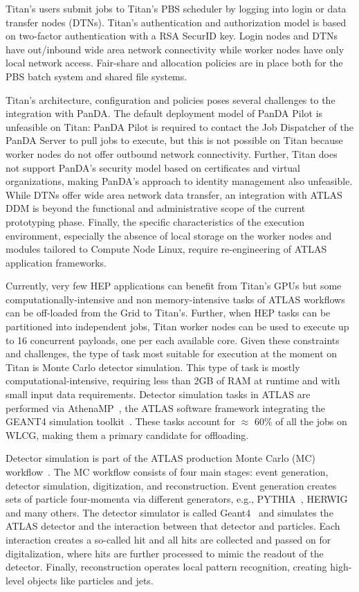 Titan's users submit jobs to Titan's PBS scheduler by logging into login or data
transfer nodes (DTNs). Titan's authentication and authorization model is based
on two-factor authentication with a RSA SecurID key. Login nodes and DTNs have
out/inbound wide area network connectivity while worker nodes have only local
network access. Fair-share and allocation policies are in place both for the PBS
batch system and shared file systems.

Titan's architecture, configuration and policies poses several challenges to the
integration with PanDA. The default deployment
model of PanDA Pilot is unfeasible on Titan: PanDA Pilot is required to contact
the Job Dispatcher of the PanDA Server to pull jobs to execute, but this is not
possible on Titan because worker nodes do not offer outbound network
connectivity. Further, Titan does not support PanDA's security model based on
certificates and virtual organizations, making PanDA's approach to identity
management also unfeasible. While DTNs offer wide area network data transfer, an
integration with ATLAS DDM is beyond the functional and administrative scope of
the current prototyping phase. Finally, the specific characteristics of the
execution environment, especially the absence of local storage on the worker
nodes and modules tailored to Compute Node Linux, require re-engineering of
ATLAS application frameworks.

Currently, very few HEP applications can benefit from Titan's GPUs but some
computationally-intensive and non memory-intensive tasks of ATLAS workflows can
be off-loaded from the Grid to Titan's. Further, when HEP tasks can be
partitioned into independent jobs, Titan worker nodes can be used to execute up
to 16 concurrent payloads, one per each available core. Given these constraints
and challenges, the type of task most suitable for execution at the moment on
Titan is Monte Carlo detector simulation. This type of task is mostly
computational-intensive, requiring less than 2GB of RAM at runtime and with
small input data requirements. Detector simulation tasks in ATLAS are performed
via AthenaMP~\cite{aad2010atlas}, the ATLAS software framework integrating the
GEANT4 simulation toolkit~\cite{agostinelli2003geant4}. These tasks account for
$\approx$ 60\% of all the jobs on WLCG, making them a primary candidate for
offloading.

Detector simulation is part of the ATLAS production Monte Carlo (MC)
workflow~\cite{rimoldi2006atlas,de2013delphes,ritsch2014atlas}. The MC workflow
consists of four main stages: event generation, detector simulation,
digitization, and reconstruction. Event generation creates sets of particle
four-momenta via different generators, e.g., PYTHIA~\cite{sjostrand2006pythia},
HERWIG~\cite{corcella2001herwig} and many others. The detector simulator is
called Geant4~\cite{agostinelli2003geant4} and simulates the ATLAS detector and
the interaction between that detector and particles. Each interaction creates a
so-called hit and all hits are collected and passed on for digitalization, where
hits are further processed to mimic the readout of the detector. Finally,
reconstruction operates local pattern recognition, creating high-level objects
like particles and jets.

